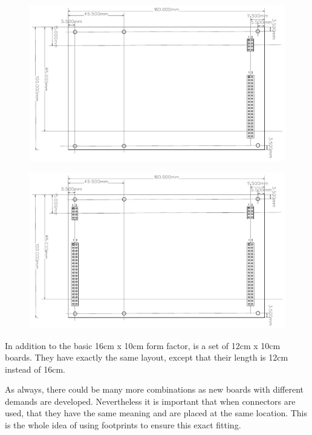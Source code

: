 \begin{figure}[ht]
    \centering
    \includegraphics[page=1, width=\textwidth]{./figures/LCS-FP-EXT-R-40-10X16.pdf}
\end{figure}

\FloatBarrier

\begin{figure}[ht]
    \centering
    \includegraphics[page=1, width=\textwidth]{./figures/LCS-FP-EXT-L-R-40-10X16.pdf}
\end{figure}

\FloatBarrier

In addition to the basic 16cm x 10cm form factor, is a set of 12cm x 10cm boards. They have exactly the same layout, except that their length is 12cm instead of 16cm. 

As always, there could be many more combinations as new boards with different demands are developed. Nevertheless it is important that when connectors are used, that they have the same meaning and are placed at the same location. This is the whole idea of using footprints to ensure this exact fitting.

